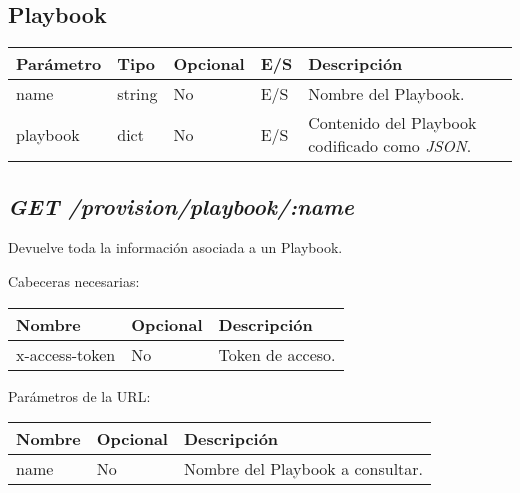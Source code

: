 	\subsection{Playbook}
	\label{sec:playbook}
		\begin{table}[h!]
			\centering
	\begin{adjustbox}{max width=\textwidth}
			\begin{tabular}{|l|l|l|l|l|}
				\hline
				Parámetro & Tipo & Opcional & E/S & Descripción \\ \hline
				name & string & No & E/S & Nombre del Playbook. \\ \hline
				playbook & dict & No & E/S & Contenido del Playbook codificado como \textit{JSON}. \\ \hline
			\end{tabular}
\end{adjustbox}
		\end{table}
	
	\subsection{\textit{GET /provision/playbook/:name}}
		Devuelve toda la información asociada a un Playbook.
		
		Cabeceras necesarias:
		\begin{table}[h!]
			\centering
	\begin{adjustbox}{max width=\textwidth}
			\begin{tabular}{|l|l|l|}
				\hline
				Nombre & Opcional & Descripción \\ \hline
				x-access-token & No & Token de acceso. \\ \hline
			\end{tabular}
\end{adjustbox}
		\end{table}
		
		Parámetros de la URL:
		\begin{table}[h!]
			\centering
	\begin{adjustbox}{max width=\textwidth}
			\begin{tabular}{|l|l|l|}
				\hline
				Nombre & Opcional & Descripción \\ \hline
				name & No & Nombre del Playbook a consultar. \\ \hline
			\end{tabular}
\end{adjustbox}
		\end{table}
		
